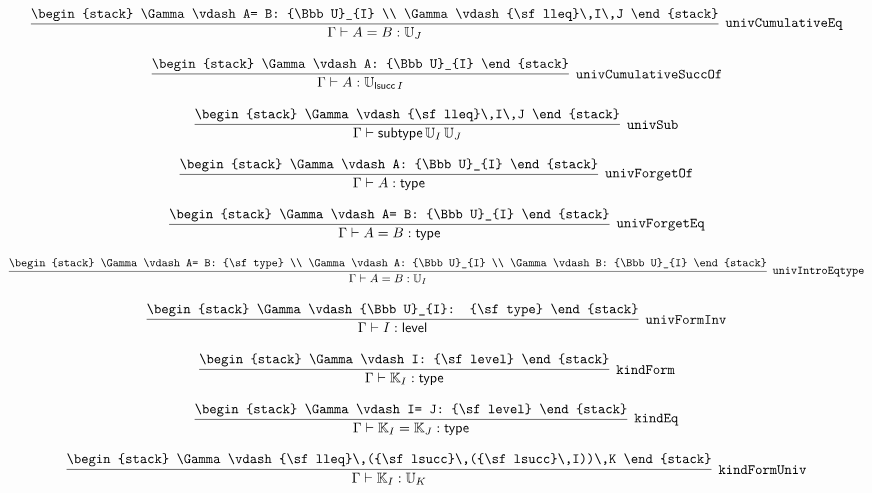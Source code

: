 \[
\infer[{\tt univCumulativeEq}]{\Gamma \vdash A= B: {\Bbb U}_{J}}{
\begin{stack}
\Gamma \vdash A= B: {\Bbb U}_{I}
\\
\Gamma \vdash {\sf lleq}\,I\,J
\end{stack}}
\]

\[
\infer[{\tt univCumulativeSuccOf}]{\Gamma \vdash A: {\Bbb U}_{{\sf lsucc}\,I}}{
\begin{stack}
\Gamma \vdash A: {\Bbb U}_{I}
\end{stack}}
\]

\[
\infer[{\tt univSub}]{\Gamma \vdash {\sf subtype}\,{\Bbb U}_{I}\,{\Bbb U}_{J}}{
\begin{stack}
\Gamma \vdash {\sf lleq}\,I\,J
\end{stack}}
\]

\[
\infer[{\tt univForgetOf}]{\Gamma \vdash A: {\sf type}}{
\begin{stack}
\Gamma \vdash A: {\Bbb U}_{I}
\end{stack}}
\]

\[
\infer[{\tt univForgetEq}]{\Gamma \vdash A= B: {\sf type}}{
\begin{stack}
\Gamma \vdash A= B: {\Bbb U}_{I}
\end{stack}}
\]

\[
\infer[{\tt univIntroEqtype}]{\Gamma \vdash A= B: {\Bbb U}_{I}}{
\begin{stack}
\Gamma \vdash A= B: {\sf type}
\\
\Gamma \vdash A: {\Bbb U}_{I}
\\
\Gamma \vdash B: {\Bbb U}_{I}
\end{stack}}
\]

\[
\infer[{\tt univFormInv}]{\Gamma \vdash I: {\sf level}}{
\begin{stack}
\Gamma \vdash {\Bbb U}_{I}: {\sf type}
\end{stack}}
\]

\[
\infer[{\tt kindForm}]{\Gamma \vdash {\Bbb K}_{I}: {\sf type}}{
\begin{stack}
\Gamma \vdash I: {\sf level}
\end{stack}}
\]

\[
\infer[{\tt kindEq}]{\Gamma \vdash {\Bbb K}_{I}= {\Bbb K}_{J}: {\sf type}}{
\begin{stack}
\Gamma \vdash I= J: {\sf level}
\end{stack}}
\]

\[
\infer[{\tt kindFormUniv}]{\Gamma \vdash {\Bbb K}_{I}: {\Bbb U}_{K}}{
\begin{stack}
\Gamma \vdash {\sf lleq}\,({\sf lsucc}\,({\sf lsucc}\,I))\,K
\end{stack}}
\]

